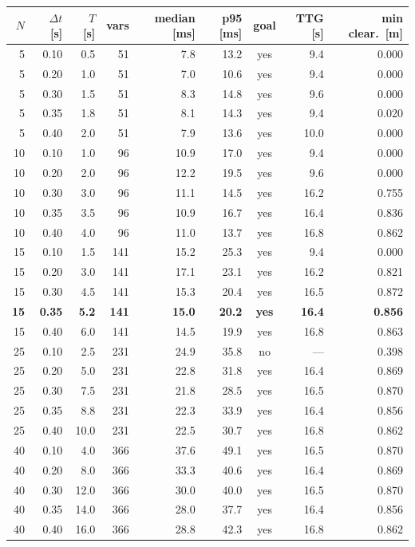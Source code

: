 \begin{tabular}{rrrrrrcrr}
  \toprule
  $N$ & $\Delta t$ [s] & $T$ [s] & vars & median [ms] & p95 [ms] & goal & TTG [s] & min clear.\ [m] \\
  \midrule
  5 & 0.10 & 0.5 & 51 & 7.8 & 13.2 & yes & 9.4 & 0.000 \\
  5 & 0.20 & 1.0 & 51 & 7.0 & 10.6 & yes & 9.4 & 0.000 \\
  5 & 0.30 & 1.5 & 51 & 8.3 & 14.8 & yes & 9.6 & 0.000 \\
  5 & 0.35 & 1.8 & 51 & 8.1 & 14.3 & yes & 9.4 & 0.020 \\
  5 & 0.40 & 2.0 & 51 & 7.9 & 13.6 & yes & 10.0 & 0.000 \\
  10 & 0.10 & 1.0 & 96 & 10.9 & 17.0 & yes & 9.4 & 0.000 \\
  10 & 0.20 & 2.0 & 96 & 12.2 & 19.5 & yes & 9.6 & 0.000 \\
  10 & 0.30 & 3.0 & 96 & 11.1 & 14.5 & yes & 16.2 & 0.755 \\
  10 & 0.35 & 3.5 & 96 & 10.9 & 16.7 & yes & 16.4 & 0.836 \\
  10 & 0.40 & 4.0 & 96 & 11.0 & 13.7 & yes & 16.8 & 0.862 \\
  15 & 0.10 & 1.5 & 141 & 15.2 & 25.3 & yes & 9.4 & 0.000 \\
  15 & 0.20 & 3.0 & 141 & 17.1 & 23.1 & yes & 16.2 & 0.821 \\
  15 & 0.30 & 4.5 & 141 & 15.3 & 20.4 & yes & 16.5 & 0.872 \\
  \textbf{15} & \textbf{0.35} & \textbf{5.2} & \textbf{141} & \textbf{15.0} & \textbf{20.2} & \textbf{yes} & \textbf{16.4} & \textbf{0.856} \\
  15 & 0.40 & 6.0 & 141 & 14.5 & 19.9 & yes & 16.8 & 0.863 \\
  25 & 0.10 & 2.5 & 231 & 24.9 & 35.8 & no & --- & 0.398 \\
  25 & 0.20 & 5.0 & 231 & 22.8 & 31.8 & yes & 16.4 & 0.869 \\
  25 & 0.30 & 7.5 & 231 & 21.8 & 28.5 & yes & 16.5 & 0.870 \\
  25 & 0.35 & 8.8 & 231 & 22.3 & 33.9 & yes & 16.4 & 0.856 \\
  25 & 0.40 & 10.0 & 231 & 22.5 & 30.7 & yes & 16.8 & 0.862 \\
  40 & 0.10 & 4.0 & 366 & 37.6 & 49.1 & yes & 16.5 & 0.870 \\
  40 & 0.20 & 8.0 & 366 & 33.3 & 40.6 & yes & 16.4 & 0.869 \\
  40 & 0.30 & 12.0 & 366 & 30.0 & 40.0 & yes & 16.5 & 0.870 \\
  40 & 0.35 & 14.0 & 366 & 28.0 & 37.7 & yes & 16.4 & 0.856 \\
  40 & 0.40 & 16.0 & 366 & 28.8 & 42.3 & yes & 16.8 & 0.862 \\
  \bottomrule
\end{tabular}
